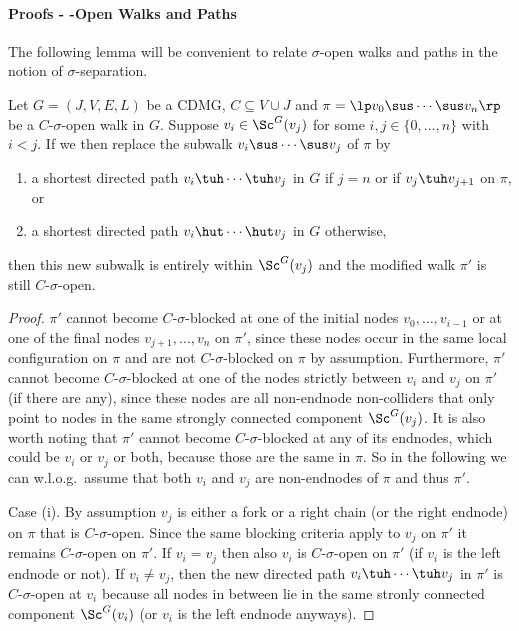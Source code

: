 \paragraph{Proofs - \textsigma-Open Walks and Paths}\hfill%

The following lemma will be convenient to relate $\sigma$-open walks and paths in the notion of $\sigma$-separation.


\begin{Lem}\label{lem:replace_walk}
Let $G=(J,V,E,L)$ be a CDMG, $C \subseteq V \cup J$ and $\pi = \lp  v_0 \sus \cdots \sus v_n \rp$ be a $C$-$\sigma$-open walk in $G$. 
  Suppose $v_i \in \Sc^G(v_j)$ for some $i,j \in \{0,\dots,n\}$ with $i < j$.
If we then replace the subwalk $v_i \sus \cdots \sus v_j$ of $\pi$ by 
  \begin{enumerate}[label=(\roman*)]
      \item a shortest directed path $v_i \tuh \cdots \tuh v_j$ in $G$ if $j = n$ or if $v_j \tuh v_{j+1}$ on $\pi$, or 
    \item a shortest directed path $v_i \hut \cdots \hut v_j$ in $G$ otherwise,
  \end{enumerate}
  then this new subwalk is entirely within $\Sc^G(v_j)$ and the modified walk $\pi'$ is still $C$-$\sigma$-open.
\begin{proof}
$\pi'$ cannot become $C$-$\sigma$-blocked at one of the initial nodes $v_0, \dots, v_{i-1}$ or at one of the final nodes $v_{j+1}, \dots, v_n$ on $\pi'$, since these nodes occur in the same local configuration on $\pi$ and are not $C$-$\sigma$-blocked on $\pi$ by assumption.
Furthermore, $\pi'$ cannot become $C$-$\sigma$-blocked at one of the nodes strictly between $v_i$ and $v_j$ on $\pi'$ (if there are any), since these nodes are all non-endnode non-colliders that only point to nodes in the same strongly connected component $\Sc^G(v_j)$. It is also worth noting that $\pi'$ cannot become $C$-$\sigma$-blocked at any of its endnodes, which could be $v_i$ or $v_j$ or both, because those are the same in $\pi$. So in the following we can w.l.o.g.\ assume that both $v_i$ and $v_j$ are non-endnodes of $\pi$ and thus $\pi'$.

Case (i). By assumption $v_j$ is either a fork or a right chain (or the right endnode) on $\pi$ that is $C$-$\sigma$-open. Since the same blocking criteria apply to $v_j$ on $\pi'$ it remains $C$-$\sigma$-open on $\pi'$. If $v_i=v_j$ then also $v_i$ is $C$-$\sigma$-open on $\pi'$ (if $v_i$ is the left endnode or not). If $v_i \neq v_j$, then the new directed path $v_i \tuh \cdots \tuh v_j$ in $\pi'$ is $C$-$\sigma$-open at $v_i$ because all nodes in between lie in the same stronly connected component $\Sc^G(v_i)$ (or $v_i$ is the left endnode anyways).


\end{proof}
\end{Lem}
